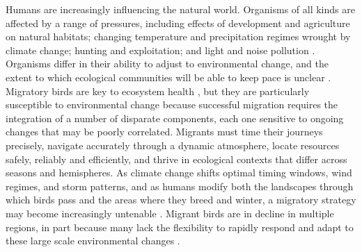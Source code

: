 \documentclass[a4paper, nobind]{templates/ociamthesis}
\begin{document}
Humans are increasingly influencing the natural world. Organisms of all kinds are affected by a range of pressures, including effects of development and agriculture on natural habitats; changing temperature and precipitation regimes wrought by climate change; hunting and exploitation; and light and noise pollution \autocite{gastonEcologicalImpactsNighttime2013,hanskiHabitatLossDynamics2011,mantyka-pringleInteractionsClimateHabitat2012,benitez-lopezImpactHuntingTropical2017,kuncAquaticNoisePollution2016,urbanAcceleratingExtinctionRisk2015}. Organisms differ in their ability to adjust to environmental change, and the extent to which ecological communities will be able to keep pace is unclear \autocite{feeleyAmazonVulnerabilityClimate2012,liangHowDisturbanceCompetition2018,poloczanskaGlobalImprintClimate2013,urbanImprovingForecastBiodiversity2016}. Migratory birds are key to ecosystem health \autocite{bauerMigratoryAnimalsCouple2014}, but they are particularly susceptible to environmental change because successful migration requires the integration of a number of disparate components, each one sensitive to ongoing changes that may be poorly correlated. Migrants must time their journeys precisely, navigate accurately through a dynamic atmosphere, locate resources safely, reliably and efficiently, and thrive in ecological contexts that differ across seasons and hemispheres. As climate change shifts optimal timing windows, wind regimes, and storm patterns, and as humans modify both the landscapes through which birds pass and the areas where they breed and winter, a migratory strategy may become increasingly untenable \autocite{wilcoveGoingGoingGone2008,rungeProtectedAreasGlobal2015}. Migrant birds are in decline in multiple regions, in part because many lack the flexibility to rapidly respond and adapt to these large scale environmental changes \autocite{beresfordPhenologyClimateChange2019,bothAvianPopulationConsequences2010,fraserIndividualVariabilityMigration2019,sandersonLongtermPopulationDeclines2006}.
\end{document}

